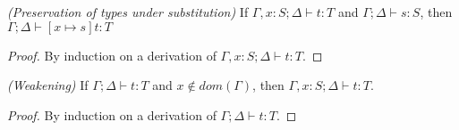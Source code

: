 \begin{lemma}
\emph{(Preservation of types under substitution)}
\label{appdx:lem:substitution}
If $\Gamma, x : S ; \Delta \vdash t : T$ and $\Gamma ; \Delta \vdash s : S$, then $\Gamma ; \Delta \vdash [x \mapsto s]t : T$
\end{lemma}
\begin{proof}
By induction on a derivation of $\Gamma, x : S ; \Delta \vdash t : T$.
\end{proof}


\begin{lemma}
\emph{(Weakening)}
\label{appdx:lem:weak}
If $\Gamma ; \Delta \vdash t : T$ and $x \notin dom(\Gamma)$, then $\Gamma, x : S ; \Delta \vdash t : T$.
\end{lemma}
\begin{proof}
By induction on a derivation of $\Gamma ; \Delta \vdash t : T$.
\end{proof}


